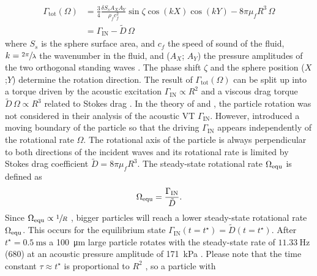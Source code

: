 \begin{equation}
  \label{eq:VT-Eq1}
  \begin{split}
      \Gamma_{\text{tot}}(\Omega) &= \frac{3}{4} \frac{\delta S_s A_{X} 
      A_{Y}}{\rho_{f} c_{f}^{2}} \sin\zeta \cos(kX) \cos(kY) - 8 \pi \mu_f 
      R^3\,\Omega \\
     &= \Gamma_{\text{IN}} - \tilde{D}\,\Omega
   \end{split}
 \end{equation}
where $S_s$ is the sphere surface area, and $c_f$ the speed of sound of the 
fluid, $k=\sfrac{2\pi}{\lambda}$ the wavenumber in the fluid, and ($A_{X}$; 
$A_{Y}$) the pressure amplitudes of the two orthogonal standing waves 
\cite{Wang1989, Lamprecht2013}.  The phase shift $\zeta$ and the sphere position 
($X$;$Y$) determine the rotation direction.  The result of 
$\Gamma_{\text{tot}}(\Omega)$ can be split up into a torque driven by the 
acoustic excitation $\Gamma_{\text{IN}} \propto R^{2}$ and a viscous drag torque 
$\tilde{D}\,\Omega \propto R^{3}$ related to Stokes drag \cite{Lamprecht2013}. In 
the theory of \citeauthor{Nyborg1958} \cite{Nyborg1958} and \citeauthor{Wang1989} 
\cite{Wang1989}, the particle rotation was not considered in their analysis of the 
acoustic VT $\Gamma_{\text{IN}}$.  However, \citeauthor{Lamprecht2013} 
\cite{Lamprecht2013} introduced a moving boundary of the particle so that the 
driving $\Gamma_{\text{IN}}$ appears independently of the rotational rate 
$\Omega$. The rotational axis of the particle is always perpendicular to both 
directions of the incident waves and its rotational rate is limited by Stokes 
drag coefficient $\tilde{D} = 8 \pi \mu_f R^3$. The steady-state rotational rate 
$\Omega_{\mathrm{equ}}$ is defined as
\begin{equation}
  \label{eq:VT-AcGovEqConti}
  \Omega_{\mathrm{equ}}=\frac{\Gamma_{\text{IN}}}{\tilde{D}}.
\end{equation}
Since $\Omega_{\mathrm{equ}} \propto \sfrac{1}{R}$ \cite{Lamprecht2013}, bigger particles will 
reach a lower steady-state rotational rate $\Omega_{\mathrm{equ}}$. This occurs for the 
equilibrium state $\Gamma_{\text{IN}}(t=t^\star)= \tilde{D} (t = t^\star )$.  
After $ t^\star = \SI{0.5}{\milli\second}$ a \SI{100}{\micro\meter} large 
particle rotates with the steady-state rate of $\SI{11.33}{\hertz}$
(\SI{680}{\rpm}) at an acoustic pressure amplitude of \SI{171}{\kilo\pascal} 
\cite{Lamprecht2015}. Please note that the time constant $\tau \approx 
t^{\star}$ is proportional to $R^2$ \cite{Lamprecht2015}, so a particle with 
